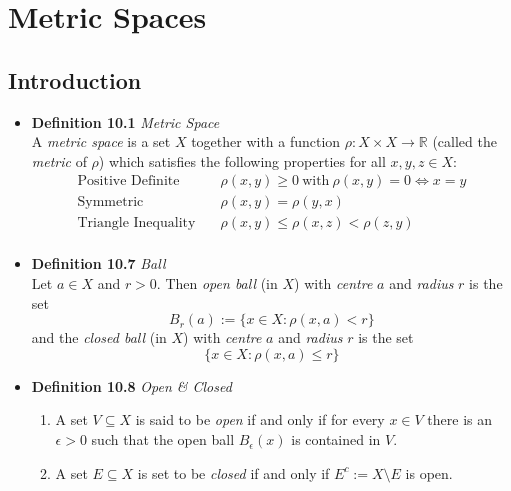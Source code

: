 \documentclass[11pt,a4paper]{article}
\begin{document}
\section{Metric Spaces}

\subsection{Introduction}

\begin{itemize}
    \item \textbf{Definition 10.1} \emph{Metric Space} \\
        A \emph{metric space} is a set $X$ together with a function
        $\rho : X \times X \to \mathbb{R}$ (called the \emph{metric} of $\rho$) which
        satisfies the following properties for all $x, y, z \in X$:
        \begin{align*}{}
            \text{Positive Definite} \quad & \rho(x, y) \geq 0 \ \text{with} \ \rho(x, y) = 0
            \iff x = y \\
            \text{Symmetric} \quad & \rho(x, y) = \rho(y, x) \\
            \text{Triangle Inequality} \quad & \rho(x, y) \leq \rho(x, z) < \rho(z, y) \\
        \end{align*}

    \item \textbf{Definition 10.7} \emph{Ball} \\
        Let $a \in X$ and $r > 0$.
        Then \emph{open ball} (in $X$) with \emph{centre} $a$ and \emph{radius} $r$ is the set
        \[
            B_r(a) := \{ x \in X : \rho(x, a) < r \}
        \]
        and the \emph{closed ball} (in $X$) with \emph{centre} $a$ and \emph{radius} $r$ is
        the set
        \[
            \{ x \in X : \rho (x, a) \leq r \}
        \]

    \item \textbf{Definition 10.8} \emph{Open \& Closed}
        \begin{enumerate}
            \item A set $V \subseteq X$ is said to be \emph{open} if and only if
                for every $x \in V$ there is an $\epsilon > 0$ such that the open ball
                $B_\epsilon (x)$ is contained in $V$.
            \item A set $E \subseteq X$ is set to be \emph{closed} if and only if
                $E^c := X \setminus E$ is open.
        \end{enumerate}


\end{itemize}
\end{document}
